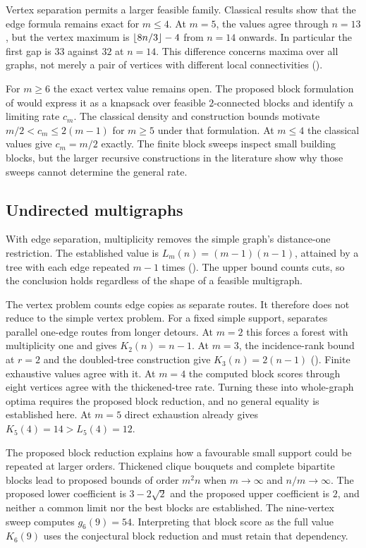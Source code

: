 Vertex separation permits a larger feasible family. Classical results show
that the edge formula remains exact for $m\le4$. At $m=5$, the values agree
through $n=13$, but the vertex maximum is $\left\lfloor 8n/3 \right\rfloor-4$ from $n=14$
onwards. In particular the first gap is $33$ against $32$ at $n=14$.
This difference concerns maxima over all graphs, not merely a pair of
vertices with different local connectivities
().

For $m\ge6$ the exact vertex value remains open. The proposed block
formulation of  would express it as a knapsack
over feasible $2$-connected blocks and identify a limiting rate $c_m$.
The classical density and construction bounds motivate
$m/2<c_m\le2(m-1)$ for $m\ge5$ under that formulation. At $m\le4$ the
classical values give $c_m=m/2$ exactly. The finite block sweeps inspect
small building blocks, but the larger recursive constructions in the
literature show why those sweeps cannot determine the general rate.

\subsection{Undirected multigraphs}
\label{sec:status-multigraph}

With edge separation, multiplicity removes the simple graph's distance-one
restriction. The established value is $L_m(n)=(m-1)(n-1)$, attained by a
tree with each edge repeated $m-1$ times ().
The upper bound counts cuts, so the conclusion holds regardless of the
shape of a feasible multigraph.

The vertex problem counts edge copies as separate routes. It therefore does
not reduce to the simple vertex problem. For a fixed simple support,
 separates parallel one-edge routes from longer
detours. At $m=2$ this forces a forest with multiplicity one and gives
$K_2(n)=n-1$. At $m=3$, the incidence-rank bound at $r=2$ and the doubled-tree
construction give $K_3(n)=2(n-1)$
(). Finite exhaustive values agree with it.
At $m=4$ the computed block scores through eight vertices agree with the
thickened-tree rate. Turning these into whole-graph optima requires the
proposed block reduction, and no general equality is established here. At $m=5$ direct exhaustion
already gives $K_5(4)=14>L_5(4)=12$.

The proposed block reduction explains how a favourable small support could
be repeated at larger orders. Thickened clique bouquets and complete
bipartite blocks lead to proposed bounds of order $m^2n$ when
$m\to\infty$ and $n/m\to\infty$. The proposed lower coefficient is
$3-2\sqrt2$ and the proposed upper coefficient is $2$, and neither a common
limit nor the best blocks are established. The nine-vertex sweep computes
$g_6(9)=54$. Interpreting that block score as the full value $K_6(9)$ uses
the conjectural block reduction and must retain that dependency.

